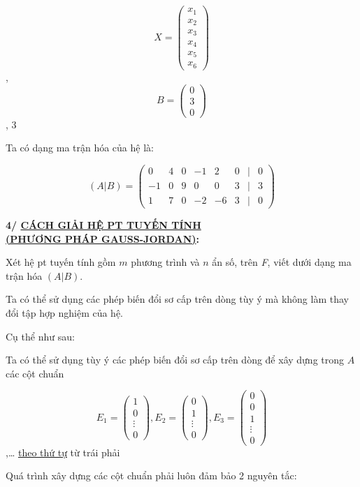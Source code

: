 \documentclass[12pt,a4paper]{article}
\let\ul\uline
\begin{document}
$$X = \begin{pmatrix} x_1 \\ x_2 \\ x_3 \\ x_4 \\ x_5 \\ x_6 \end{pmatrix}$$,
$$B = \begin{pmatrix} 0 \\ 3 \\ 0 \end{pmatrix}$$, $3$

Ta có dạng ma trận hóa của hệ là:

$$(A|B) = \begin{pmatrix} 0 & 4 & 0 & -1 & 2 & 0 & | & 0 \\ -1 & 0 & 9 & 0 & 0 & 3 & | & 3 \\ 1 & 7 & 0 & -2 & -6 & 3 & | & 0 \end{pmatrix}$$

\textbf{4/ \ul{CÁCH GIẢI HỆ PT TUYẾN TÍNH}}\\
\textbf{\ul{(PHƯƠNG PHÁP GAUSS-JORDAN)}:}

Xét hệ pt tuyến tính gồm $m$ phương
trình và $n$ ẩn số, trên \emph{F}, viết
dưới dạng ma trận hóa $(A|B)$.

Ta có thể sử dụng các phép biến đổi sơ cấp trên dòng tùy ý mà không làm
thay đổi tập hợp nghiệm của hệ.

Cụ thể như sau:

Ta có thể sử dụng tùy ý các phép biến đổi sơ cấp trên dòng để xây dựng
trong $A$ các cột chuẩn

$$E_1 = \begin{pmatrix} 1 \\ 0 \\ \vdots \\ 0 \end{pmatrix}, E_2 = \begin{pmatrix} 0 \\ 1 \\ \vdots \\ 0 \end{pmatrix}, E_3 = \begin{pmatrix} 0 \\ 0 \\ 1 \\ \vdots \\ 0 \end{pmatrix}$$,\ldots{} \ul{theo thứ tự} từ trái
phải

Quá trình xây dựng các cột chuẩn phải luôn đảm bảo 2 nguyên tắc:
\end{document}
